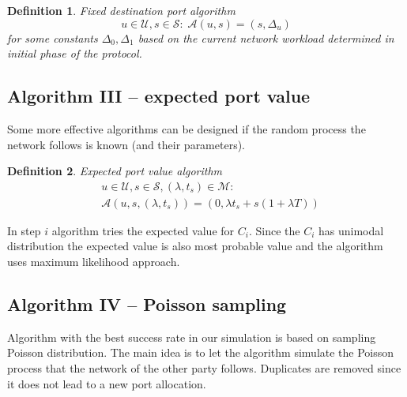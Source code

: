 \documentclass{llncs}
\newtheorem{mydef}{Definition}
\begin{document}
\begin{mydef}
Fixed destination port algorithm
\[
u \in \mathcal{U}, s \in \mathcal{S}: \;
\mathcal{A}(u, s) = (s, \Delta_u)
\] for some constants $\Delta_0, \Delta_1$ based on the current network workload determined in initial phase
of the protocol.
\end{mydef}

\subsection{Algorithm III -- expected port value}
Some more effective algorithms can be designed if the random process the network follows is known (and their
parameters).

\begin{mydef}
Expected port value algorithm
\begin{align*}
& u \in \mathcal{U}, s \in \mathcal{S}, (\lambda, t_s) \in \mathcal{M}:\\
& \mathcal{A}(u, s, (\lambda, t_s)) = (0, \lambda t_s + s(1 + \lambda T))
\end{align*}
\end{mydef}

In step $i$ algorithm tries the expected value for $C_i$. Since the $C_i$ has unimodal distribution
the expected value is also most probable value and the algorithm uses maximum likelihood approach.

\subsection{Algorithm IV -- Poisson sampling}
Algorithm with the best success rate in our simulation is based on sampling Poisson distribution.
The main idea is to let the algorithm simulate the Poisson process that the network of the
other party follows. Duplicates are removed since it does not lead to a new port allocation.
\end{document}

